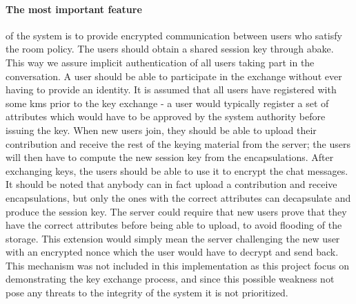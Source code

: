 \paragraph{The most important feature} of the system is to provide encrypted communication between users who satisfy the room policy. The users should obtain a shared session key through \gls{abake}. This way we assure implicit authentication of all users taking part in the conversation. A user should be able to participate in the exchange without ever having to provide an identity. It is assumed that all users have registered with some \gls{kms} prior to the key exchange - a user would typically register a set of attributes which would have to be approved by the system authority before issuing the key. When new users join, they should be able to upload their contribution and receive the rest of the keying material from the server; the users will then have to compute the new session key from the encapsulations. After exchanging keys, the users should be able to use it to encrypt the chat messages. It should be noted that anybody can in fact upload a contribution and receive encapsulations, but only the ones with the correct attributes can decapsulate and produce the session key. The server could require that new users prove that they have the correct attributes before being able to upload, to avoid flooding of the storage. This extension would simply mean the server challenging the new user with an encrypted nonce which the user would have to decrypt and send back. This mechanism was not included in this implementation as this project focus on demonstrating the key exchange process, and since this possible weakness not pose any threats to the integrity of the system it is not prioritized. 



